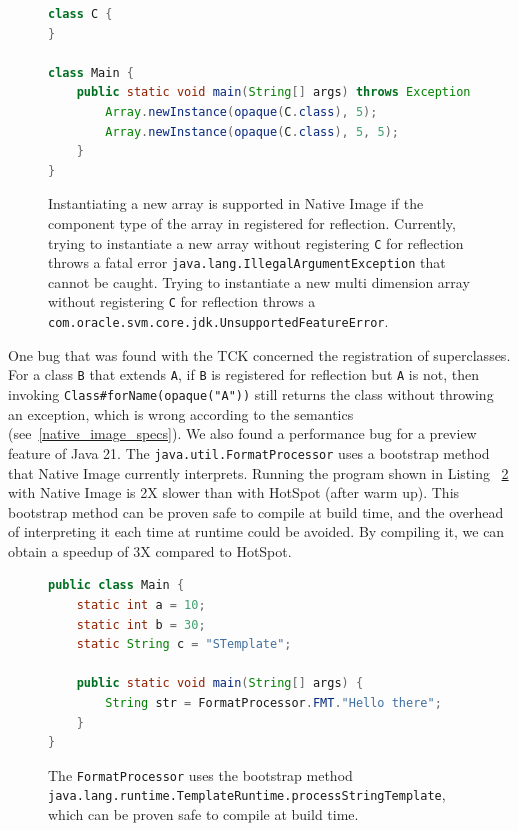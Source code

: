 \begin{figure}[ht]
    \centering
\begin{lstlisting}[language=Java]
class C {
}

class Main {
    public static void main(String[] args) throws Exception {
        Array.newInstance(opaque(C.class), 5);
        Array.newInstance(opaque(C.class), 5, 5);
    }
}
\end{lstlisting}
    \caption{Instantiating a new array is supported in Native Image if the component type of the array in registered for reflection. Currently, trying to instantiate a new array without registering \texttt{C} for reflection throws a fatal error \texttt{java.lang.IllegalArgumentException} that cannot be caught. Trying to instantiate a new multi dimension array without registering \texttt{C} for reflection throws a \texttt{com.oracle.svm.core.jdk.UnsupportedFeatureError}.}
    \label{fig:new_multi_array_bug}
\end{figure}

One bug that was found with the TCK concerned the registration of superclasses. For a class \verb|B| that extends \verb|A|, if \verb|B| is registered for reflection but \verb|A| is not, then invoking \verb|Class#forName(opaque("A"))| still returns the class without throwing an exception, which is wrong according to the semantics (see~\ref{native_image_specs}). 
We also found a performance bug for a preview feature of Java 21. The \verb|java.util.FormatProcessor| uses a bootstrap method that Native Image currently interprets. Running the program shown in Listing ~\ref{fig:format_processor} with Native Image is 2X slower than with HotSpot (after warm up). This bootstrap method can be proven safe to compile at build time, and the overhead of interpreting it each time at runtime could be avoided. By compiling it, we can obtain a speedup of 3X compared to HotSpot.

\begin{figure}[ht]
    \centering
\begin{lstlisting}[language=Java]
public class Main {
    static int a = 10;
    static int b = 30;
    static String c = "STemplate";

    public static void main(String[] args) {
        String str = FormatProcessor.FMT."Hello there";
    }
}
\end{lstlisting}
    \caption{The \texttt{FormatProcessor} uses the bootstrap method \texttt{java.lang.runtime.TemplateRuntime.processStringTemplate}, which can be proven safe to compile at build time. }
    \label{fig:format_processor}
\end{figure}


